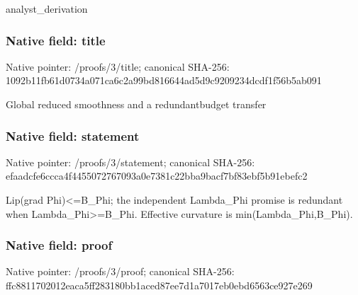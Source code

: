 \documentclass[10pt,a4paper]{article}
\begin{document}
analyst\_derivation


\subsubsection{Native field: title}


Native pointer: /proofs/3/title; canonical SHA-256: 1092b11fb61d0734a071ca6c\allowbreak{}2a99bd816644ad5d9c920923\allowbreak{}4dcdf1f56b5ab091


Global reduced smoothness and a redundantbudget transfer


\subsubsection{Native field: statement}


Native pointer: /proofs/3/statement; canonical SHA-256: efaadcfe6ccca4f445507276\allowbreak{}7093a0e7381c22bba9bacf7b\allowbreak{}f83ebf5b91ebefc2


Lip(grad Phi)<=B\_Phi; the independent Lambda\_Phi promise is redundant when Lambda\_Phi>=B\_Phi. Effective curvature is min(Lambda\_Phi,B\_Phi).


\subsubsection{Native field: proof}


Native pointer: /proofs/3/proof; canonical SHA-256: ffc8811702012eaca5ff2831\allowbreak{}80bb1aced87ee7d1a7017eb0\allowbreak{}ebd6563ce927e269
\end{document}

